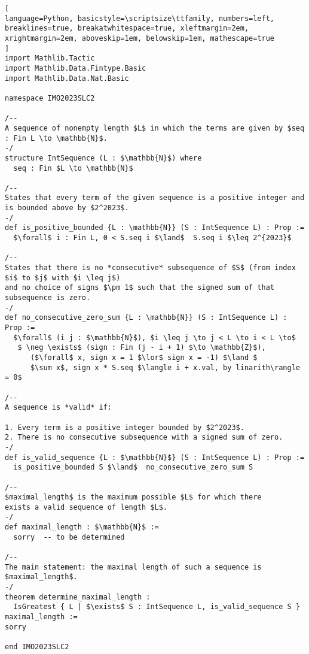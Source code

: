 \begin{tcolorbox}[enhanced, breakable, rounded corners,
    colback=green!5!white, colframe=green!75!black,
    colbacktitle=green!85!black, fonttitle=\bfseries, coltitle=white, title=Lean Theorem for 2023 IMO Shortlist Combinatorics Problem 2]
\setlength{\parskip}{1em}
\begin{lstlisting}[
language=Python, basicstyle=\scriptsize\ttfamily, numbers=left, breaklines=true, breakatwhitespace=true, xleftmargin=2em, xrightmargin=2em, aboveskip=1em, belowskip=1em, mathescape=true
]
import Mathlib.Tactic
import Mathlib.Data.Fintype.Basic
import Mathlib.Data.Nat.Basic

namespace IMO2023SLC2

/--
A sequence of nonempty length $L$ in which the terms are given by $seq : Fin L \to \mathbb{N}$.
-/
structure IntSequence (L : $\mathbb{N}$) where
  seq : Fin $L \to \mathbb{N}$

/--
States that every term of the given sequence is a positive integer and is bounded above by $2^2023$.
-/
def is_positive_bounded {L : \mathbb{N}} (S : IntSequence L) : Prop :=
  $\forall$ i : Fin L, 0 < S.seq i $\land$  S.seq i $\leq 2^{2023}$

/--
States that there is no *consecutive* subsequence of $S$ (from index $i$ to $j$ with $i \leq j$)
and no choice of signs $\pm 1$ such that the signed sum of that subsequence is zero.
-/
def no_consecutive_zero_sum {L : \mathbb{N}} (S : IntSequence L) : Prop :=
  $\forall$ (i j : $\mathbb{N}$), $i \leq j \to j < L \to i < L \to$
   $ \neg \exists$ (sign : Fin (j - i + 1) $\to \mathbb{Z}$),
      ($\forall$ x, sign x = 1 $\lor$ sign x = -1) $\land $
      $\sum x$, sign x * S.seq $\langle i + x.val, by linarith\rangle  = 0$

/--
A sequence is *valid* if:

1. Every term is a positive integer bounded by $2^2023$.
2. There is no consecutive subsequence with a signed sum of zero.
-/
def is_valid_sequence {L : $\mathbb{N}$} (S : IntSequence L) : Prop :=
  is_positive_bounded S $\land$  no_consecutive_zero_sum S

/--
$maximal_length$ is the maximum possible $L$ for which there
exists a valid sequence of length $L$.
-/
def maximal_length : $\mathbb{N}$ :=
  sorry  -- to be determined

/--
The main statement: the maximal length of such a sequence is $maximal_length$.
-/
theorem determine_maximal_length :
  IsGreatest { L | $\exists$ S : IntSequence L, is_valid_sequence S } maximal_length :=
sorry

end IMO2023SLC2
\end{lstlisting}
\end{tcolorbox}



